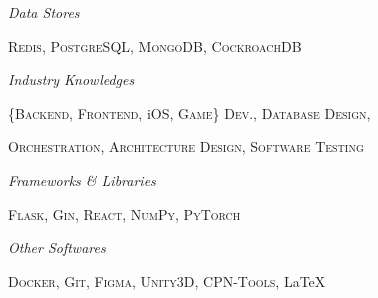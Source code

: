 \documentclass[paper=a4,fontsize=11pt]{scrartcl} %
\newlength{\spacebox}
\newcommand{\sepspace}{\vspace*{1em}}        %
\newcommand{\PersonalEntry}[2]{
        \noindent\hangindent=2em\hangafter=0 %
        \parbox{\spacebox}{        %
        \textit{#1}}               %
        \hspace{1.5em} #2 \par}    %
\newcommand{\SkillsEntry}[2]{      %
        \noindent\hangafter=0 %
        \parbox{6em}{        %
        \textit{#1}}               %
        \hspace{1.5em} #2 \par}    %
\begin{document}
\SkillsEntry{Data Stores}{\textsc{Redis}, \textsc{PostgreSQL}, \textsc{MongoDB}, \textsc{CockroachDB}}
\sepspace

\SkillsEntry{Industry Knowledges}{\{\textsc{Backend}, \textsc{Frontend}, iOS, \textsc{Game}\} \textsc{Dev.}, \textsc{Database Design},}
\SkillsEntry{}{\textsc{Orchestration}, \textsc{Architecture Design}, \textsc{Software Testing}}
\sepspace

\SkillsEntry{Frameworks \& Libraries}{\textsc{Flask}, \textsc{Gin}, \textsc{React}, \textsc{NumPy}, \textsc{PyTorch}}
\sepspace

\SkillsEntry{Other \newline Softwares}{\textsc{Docker}, \textsc{Git}, \textsc{Figma}, \textsc{Unity3D}, \textsc{CPN-Tools},  \LaTeX}
\sepspace
\end{document}
